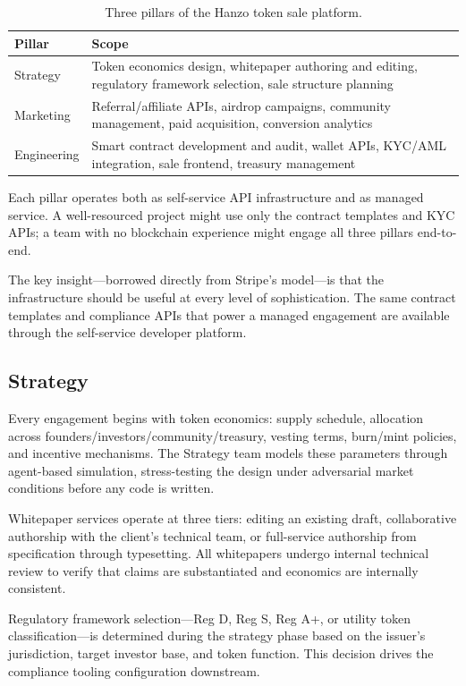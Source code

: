\documentclass[11pt,letterpaper]{article}
\begin{document}
\begin{table}[H]
\centering
\small
\begin{tabular}{lp{9cm}}
\toprule
\textbf{Pillar} & \textbf{Scope} \\
\midrule
Strategy & Token economics design, whitepaper authoring and editing,
           regulatory framework selection, sale structure planning \\
Marketing & Referral/affiliate APIs, airdrop campaigns, community management,
            paid acquisition, conversion analytics \\
Engineering & Smart contract development and audit, wallet APIs, KYC/AML
              integration, sale frontend, treasury management \\
\bottomrule
\end{tabular}
\caption{Three pillars of the Hanzo token sale platform.}
\label{tab:pillars}
\end{table}

Each pillar operates both as self-service API infrastructure and as managed
service. A well-resourced project might use only the contract templates and
KYC APIs; a team with no blockchain experience might engage all three pillars
end-to-end.

The key insight---borrowed directly from Stripe's model---is that the
infrastructure should be useful at every level of sophistication. The same
contract templates and compliance APIs that power a managed engagement are
available through the self-service developer platform.

\subsection{Strategy}

Every engagement begins with token economics: supply schedule, allocation
across founders/investors/community/treasury, vesting terms, burn/mint
policies, and incentive mechanisms. The Strategy team models these parameters
through agent-based simulation, stress-testing the design under adversarial
market conditions before any code is written.

Whitepaper services operate at three tiers: editing an existing draft,
collaborative authorship with the client's technical team, or full-service
authorship from specification through typesetting. All whitepapers undergo
internal technical review to verify that claims are substantiated and economics
are internally consistent.

Regulatory framework selection---Reg D, Reg S, Reg A+, or utility token
classification---is determined during the strategy phase based on the issuer's
jurisdiction, target investor base, and token function. This decision drives
the compliance tooling configuration downstream.
\end{document}
